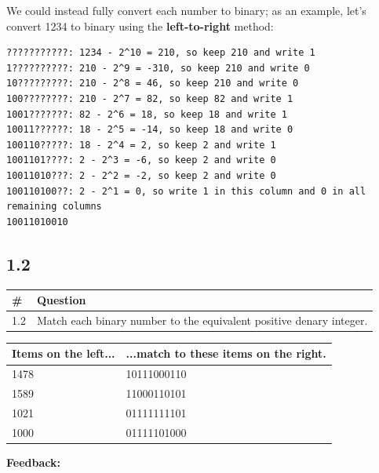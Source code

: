 We could instead fully convert each number to binary; as an example, let’s convert 1234 to binary using the \textbf{left-to-right} method:
\begin{lstlisting}
???????????: 1234 - 2^10 = 210, so keep 210 and write 1
1??????????: 210 - 2^9 = -310, so keep 210 and write 0
10?????????: 210 - 2^8 = 46, so keep 210 and write 0
100????????: 210 - 2^7 = 82, so keep 82 and write 1
1001???????: 82 - 2^6 = 18, so keep 18 and write 1
10011??????: 18 - 2^5 = -14, so keep 18 and write 0
100110?????: 18 - 2^4 = 2, so keep 2 and write 1
1001101????: 2 - 2^3 = -6, so keep 2 and write 0
10011010???: 2 - 2^2 = -2, so keep 2 and write 0
100110100??: 2 - 2^1 = 0, so write 1 in this column and 0 in all remaining columns
10011010010
\end{lstlisting}
\subsection{1.2}

\begin{tabularx}{\linewidth}{|l|X|}
\hline
\textbf{\#} & \textbf{Question} \\
\hline
1.2 & Match each binary number to the equivalent positive denary integer. \\
\hline
\end{tabularx}

\begin{tabularx}{\linewidth}{|X|X|}
\hline
\textbf{Items on the left...} & \textbf{...match to these items on the right.} \\
\hline
1478 & 10111000110 \\
1589 & 11000110101 \\
1021 & 01111111101 \\
1000 & 01111101000 \\
\hline
\end{tabularx}

\textbf{Feedback:}


